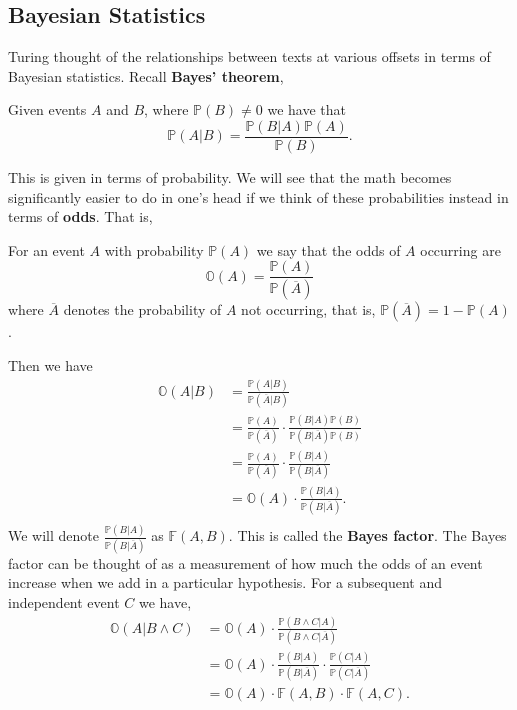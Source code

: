   \subsection{Bayesian Statistics}
  Turing thought of the relationships between texts at various
  offsets in terms of Bayesian statistics. Recall {\bf{Bayes' theorem}},
  \begin{theorem}
    Given events $A$ and $B$, where $\mathbb{P}(B) \ne 0$ we have that
    \[
      \mathbb{P}(A|B) = \frac{\mathbb{P}(B|A)\mathbb{P}(A)}{\mathbb{P}(B)}.
    \]
  \end{theorem}
  \noindent This is given in terms of probability. We will see that
  the math becomes significantly easier to do in one's head if we
  think of these probabilities instead in terms of {\bf{odds}}. That is,
  \begin{definition}
    For an event $A$ with probability $\mathbb{P}(A)$ we say that the
    odds of $A$ occurring are
    \[
      \mathbb{O}(A) = \frac{\mathbb{P}(A)}{\mathbb{P}(\overline{A})}
    \]
    where $\overline{A}$ denotes the probability of $A$ not occurring,
    that is, $\mathbb{P}(\overline{A}) = 1-\mathbb{P}(A)$.
  \end{definition}
  \noindent Then we have
  \begin{align*}
    \mathbb{O}(A|B) & =
    \frac{\mathbb{P}(A|B)}{\mathbb{P}(\overline{A}|B)}
    \\
    & =
    \frac{\mathbb{P}(A)}{\mathbb{P}(\overline{A})}\cdot\frac{\mathbb{P}(B|A)\mathbb{P}(B)}{\mathbb{P}(B|\overline{A})\mathbb{P}(B)}
    \\
    & =
    \frac{\mathbb{P}(A)}{\mathbb{P}(\overline{A})}\cdot\frac{\mathbb{P}(B|A)}{\mathbb{P}(B|\overline{A})}
    \\
    & =
    \mathbb{O}(A)\cdot\frac{\mathbb{P}(B|A)}{\mathbb{P}(B|\overline{A})}.
    \\
  \end{align*}
  \noindent We will denote
  $\frac{\mathbb{P}(B|A)}{\mathbb{P}(B|\overline{A})}$ as
  $\mathbb{F}(A,B)$. This is called the {\bf{Bayes factor}}. The
  Bayes factor can be thought of as a measurement of how much the
  odds of an event increase when we add in a particular hypothesis.
  For a subsequent and independent event $C$ we have,
  \begin{align*}
    \mathbb{O}(A|B\wedge C) & =
    \mathbb{O}(A)\cdot\frac{\mathbb{P}(B\wedge C|
    A)}{\mathbb{P}(B\wedge C| \overline{A})}
    \\
    & = \mathbb{O}(A)\cdot\frac{\mathbb{P}(B| A)}{\mathbb{P}(B|
    \overline{A})}\cdot\frac{\mathbb{P}(C|A)}{\mathbb{P}(C|\overline{A})}
    \\
    & = \mathbb{O}(A)\cdot \mathbb{F}(A,B) \cdot \mathbb{F}(A,C).
  \end{align*}
